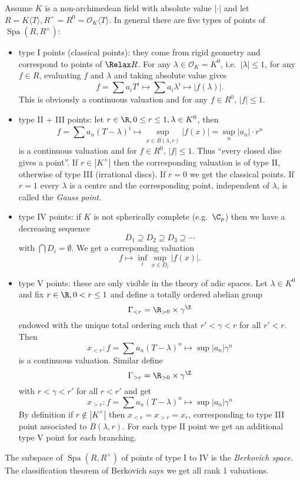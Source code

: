 \documentclass[a4paper]{article}
\renewcommand*{\O}{\mathcal{O}}
\let\Sp\Relax
\DeclareMathOperator{\Sp}{Sp} %
\DeclareMathOperator{\Spa}{Spa}
\begin{document}
\begin{eg}
  Assume \(K\) is a non-archimedean field with absolute value \(|\cdot|\) and let \(R = K \langle T\rangle, R^+ = R^0 = \O_K\langle T \rangle\). In general there are five types of points of \(\Spa(R, R^+)\):
  \begin{itemize}
  \item type I points (classical points): they come from rigid geometry and correspond to points of \(\Sp R\). For any \(\lambda \in \O_K = K^0\), i.e.\ \(|\lambda| \leq 1\), for any \(f \in R\), evaluating \(f\) and \(\lambda\) and taking absolute value gives
    \[
      f = \sum a_iT^i \mapsto \sum a_i \lambda^i \mapsto |f(\lambda)|.
    \]
    This is obviously a continuous valuation and for any \(f \in R^0\), \(|f| \leq 1\).
  \item type II + III points: let \(r \in \R, 0 \leq r \leq 1, \lambda \in K^0\), then
    \[
      f = \sum a_n (T - \lambda)^i \mapsto \sup_{x \in \overline B(\lambda, r)} |f(x)| = \sup_n |a_n| \cdot r^n
    \]
    is a continuous valuation and for \(f \in R^0\), \(|f| \leq 1\). Thus ``every closed disc gives a point''. If \(r \in |K^\times|\) then the corresponding valuation is of type II, otherwise of type III (irrational discs). If \(r = 0\) we get the classical points. If \(r = 1\) every \(\lambda\) is a centre and the corresponding point, independent of \(\lambda\), is called the \emph{Gauss point}.
  \item type IV points: if \(K\) is not spherically complete (e.g.\ \(\C_p\)) then we have a decreasing sequence
    \[
      D_1 \supseteq D_2 \supseteq D_3 \supseteq \cdots
    \]
    with \(\bigcap D_i = \emptyset\). We get a correponding valuation
    \[
      f \mapsto \inf_i \sup_{x \in D_i} |f(x)|.
    \]
  \item type V points: these are only visible in the theory of adic spaces. Let \(\lambda \in K^0\) and fix \(r \in \R, 0 < r \leq 1\) and define a totally ordered abelian group
    \[
      \Gamma_{< r} = \R_{> 0} \times \gamma^\Z
    \]
    endowed with the unique total ordering such that \(r' < \gamma < r\) for all \(r' < r\). Then
    \[
      x_{< r}: f = \sum a_n(T - \lambda)^n \mapsto \sup |a_n| \gamma^n
    \]
    is a continuous valuation. Similar define
    \[
      \Gamma_{> r} = \R_{> 0} \times \gamma^\Z
    \]
    with \(r < \gamma < r'\) for all \(r < r'\) and get
    \[
      x_{> r}: f = \sum a_n (T - \lambda)^n \mapsto \sup |a_n| \gamma^n
    \]
    By definition if \(r \notin |K^\times|\) then \(x_{< r} = x_{> r} = x_r\), corresponding to type III point associated to \(\overline B(\lambda, r)\). For each type II point we get an additional type V point for each branching.
  \end{itemize}

  The subspace of \(\Spa(R, R^+)\) of points of type I to IV is the \emph{Berkovich space}. The classification theorem of Berkovich says we get all rank 1 valuations.
\end{eg}
\end{document}
